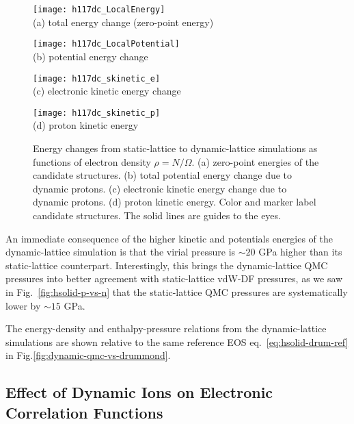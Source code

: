 \begin{figure}[h]
\centering
\begin{minipage}{0.49\textwidth}
\centering
\texttt{[image: h117dc\_LocalEnergy]}\\
(a) total energy change (zero-point energy)
\end{minipage}
\begin{minipage}{0.49\textwidth}
\centering
\texttt{[image: h117dc\_LocalPotential]}\\
(b) potential energy change
\end{minipage}
\begin{minipage}{0.49\textwidth}
\centering
\texttt{[image: h117dc\_skinetic\_e]}\\
(c) electronic kinetic energy change
\end{minipage}
\begin{minipage}{0.49\textwidth}
\centering
\texttt{[image: h117dc\_skinetic\_p]}\\
(d) proton kinetic energy
\end{minipage}
\caption{Energy changes from static-lattice to dynamic-lattice simulations as functions of electron density $\rho=N/\Omega$. (a) zero-point energies of the candidate structures. (b) total potential energy change due to dynamic protons. (c) electronic kinetic energy change due to dynamic protons. (d) proton kinetic energy. Color and marker label candidate structures. The solid lines are guides to the eyes.}
\label{fig:hsolid-ion-energy}
\end{figure}

An immediate consequence of the higher kinetic and potentials energies of the dynamic-lattice simulation is that the virial pressure is $\sim 20$ GPa higher than its static-lattice counterpart.
Interestingly, this brings the dynamic-lattice QMC pressures into better agreement with static-lattice vdW-DF pressures, as we saw in Fig.~\ref{fig:hsolid-p-vs-n} that the static-lattice QMC pressures are systematically lower by $\sim 15$ GPa.

The energy-density and enthalpy-pressure relations from the dynamic-lattice simulations are shown relative to the same reference EOS eq.~\ref{eq:hsolid-drum-ref} in Fig.\ref{fig:dynamic-qmc-vs-drummond}.


\subsection{Effect of Dynamic Ions on Electronic Correlation Functions}

